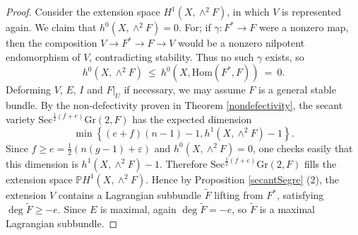 \documentclass[10pt]{amsart}
\numberwithin{equation}{section}
\newcommand{\pp}{\mathbb P}
\newcommand{\Hom}{\mathrm{Hom}}
\newcommand{\Sec}{\mathrm{Sec}}
\newcommand{\Gr}{\mathrm{Gr}}
\begin{document}
\begin{proof}
Consider the extension space $H^1 (X, \wedge^2 F)$, in which $V$ is represented again. We claim that $h^0 (X, \wedge^2 F) = 0$. For; if $\gamma \colon F^* \to F$ were a nonzero map, then the composition $V \to F^* \to F \to V$ would be a nonzero nilpotent endomorphism of $V$, contradicting stability. Thus no such $\gamma$ exists, so
\[ h^0 (X, \wedge^2 F) \ \le \ h^0 (X, \Hom(F^*, F)) \ = \ 0. \]
Deforming $V$, $E$, $I$ and $F|_U$ if necessary, we may assume $F$ is a general stable bundle.
By the non-defectivity proven in Theorem \ref{nondefectivity}, the secant variety $\Sec^{\frac{1}{2}(f + e)}\Gr(2, F)$ has the expected dimension
\[ \min \left\{ (e+f)(n-1) - 1, h^1 (X, \wedge^2 F) - 1 \right\}. \]
Since $f \ge e = \frac{1}{2}(n(g-1) + \varepsilon)$ and $h^0 (X, \wedge^2 F) = 0$, one checks easily that this dimension is $h^1 ( X, \wedge^2 F) - 1$. 
 Therefore $\Sec^{\frac{1}{2}(f+e)} \Gr(2,F)$ fills the extension space $\pp H^1 (X, \wedge^2 F)$. Hence by Proposition \ref{secantSegre} (2), the extension $V$ contains a Lagrangian subbundle $\widetilde{F}$ lifting from $F^*$, satisfying $\deg \widetilde{F} \ge -e$. Since $E$ is maximal, again $\deg \widetilde{F} = -e$, so $\widetilde{F}$ is a maximal Lagrangian subbundle.


\end{proof}
\end{document}

